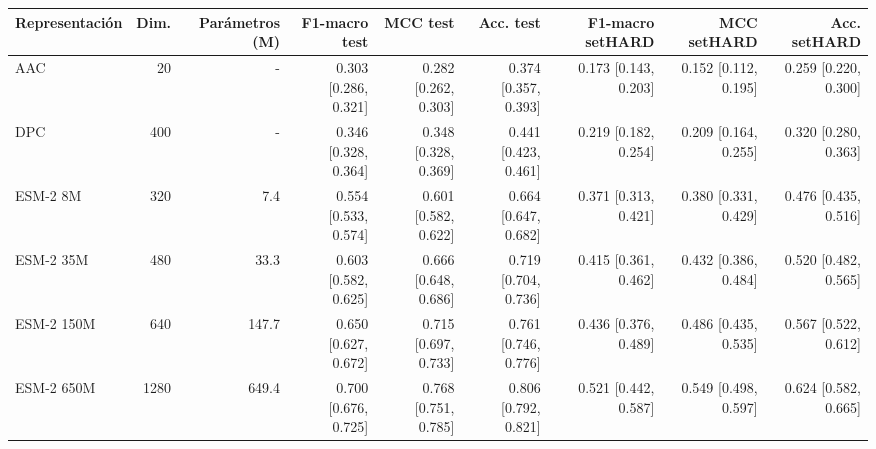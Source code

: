 \begin{tabular}{lrrrrrrrr}
\toprule
Representación & Dim. & Parámetros (M) & F1-macro test & MCC test & Acc. test & F1-macro setHARD & MCC setHARD & Acc. setHARD \\
\midrule
AAC & 20 & - & 0.303 [0.286, 0.321] & 0.282 [0.262, 0.303] & 0.374 [0.357, 0.393] & 0.173 [0.143, 0.203] & 0.152 [0.112, 0.195] & 0.259 [0.220, 0.300] \\
DPC & 400 & - & 0.346 [0.328, 0.364] & 0.348 [0.328, 0.369] & 0.441 [0.423, 0.461] & 0.219 [0.182, 0.254] & 0.209 [0.164, 0.255] & 0.320 [0.280, 0.363] \\
ESM-2 8M & 320 & 7.4 & 0.554 [0.533, 0.574] & 0.601 [0.582, 0.622] & 0.664 [0.647, 0.682] & 0.371 [0.313, 0.421] & 0.380 [0.331, 0.429] & 0.476 [0.435, 0.516] \\
ESM-2 35M & 480 & 33.3 & 0.603 [0.582, 0.625] & 0.666 [0.648, 0.686] & 0.719 [0.704, 0.736] & 0.415 [0.361, 0.462] & 0.432 [0.386, 0.484] & 0.520 [0.482, 0.565] \\
ESM-2 150M & 640 & 147.7 & 0.650 [0.627, 0.672] & 0.715 [0.697, 0.733] & 0.761 [0.746, 0.776] & 0.436 [0.376, 0.489] & 0.486 [0.435, 0.535] & 0.567 [0.522, 0.612] \\
ESM-2 650M & 1280 & 649.4 & 0.700 [0.676, 0.725] & 0.768 [0.751, 0.785] & 0.806 [0.792, 0.821] & 0.521 [0.442, 0.587] & 0.549 [0.498, 0.597] & 0.624 [0.582, 0.665] \\
\bottomrule
\end{tabular}
